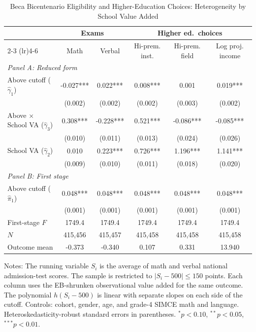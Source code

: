 \begin{table}[!htbp]
\centering
\caption{Beca Bicentenario Eligibility and Higher-Education Choices: Heterogeneity by School Value Added}
\label{tab:bicentenario-rd-va-interaction}
\begin{tabular}{lccccc}
\toprule
 & \multicolumn{2}{c}{Exams} & \multicolumn{3}{c}{Higher ed.~choices} \\
\cmidrule(lr){2-3} \cmidrule(lr){4-6}
 & Math & Verbal & Hi-prem. inst. & Hi-prem. field & Log proj. income \\
\midrule
\multicolumn{6}{l}{\textit{Panel A: Reduced form}} \\[2pt]
Above cutoff ($\hat{\gamma}_1$) & -0.027*** & 0.022*** & 0.008*** & 0.001 & 0.019*** \\
        & (0.002) & (0.002) & (0.002) & (0.003) & (0.002) \\
Above $\times$ School VA ($\hat{\gamma}_3$) & 0.308*** & -0.228*** & 0.521*** & -0.086*** & -0.085*** \\
        & (0.010) & (0.011) & (0.013) & (0.024) & (0.026) \\
School VA ($\hat{\gamma}_2$) & 0.010 & 0.223*** & 0.726*** & 1.196*** & 1.141*** \\
        & (0.009) & (0.010) & (0.011) & (0.018) & (0.020) \\
\midrule
\multicolumn{6}{l}{\textit{Panel B: First stage}} \\[2pt]
Above cutoff ($\hat{\pi}_1$) & 0.048*** & 0.048*** & 0.048*** & 0.048*** & 0.048*** \\
        & (0.001) & (0.001) & (0.001) & (0.001) & (0.001) \\
First-stage $F$ & 1749.4 & 1749.4 & 1749.4 & 1749.4 & 1749.4 \\
\midrule
$N$ & 415,456 & 415,457 & 415,458 & 415,458 & 415,458 \\
Outcome mean & -0.373 & -0.340 & 0.107 & 0.331 & 13.940 \\
\bottomrule
\end{tabular}
\par\medskip\footnotesize
\begin{minipage}{\textwidth}
Notes: The running variable $S_i$ is the average of math and verbal national admission-test scores. The sample is restricted to $|S_i - 500| \leq 150$ points. Each column uses the EB-shrunken observational value added for the same outcome. The polynomial $h(S_i - 500)$ is linear with separate slopes on each side of the cutoff. Controls: cohort, gender, age, and grade-4 SIMCE math and language. Heteroskedasticity-robust standard errors in parentheses. $^{*}p<0.10$, $^{**}p<0.05$, $^{***}p<0.01$.
\end{minipage}
\end{table}
